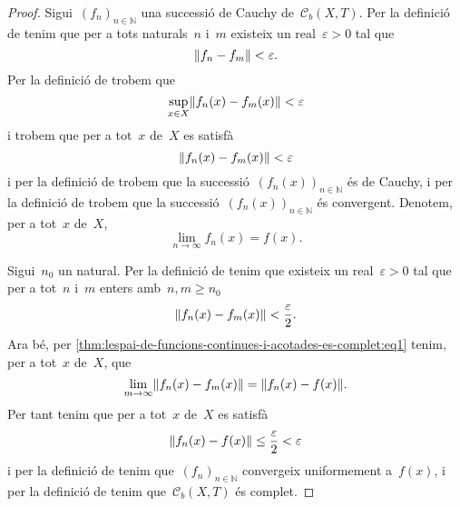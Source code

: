 \documentclass[../../main.tex]{subfiles}
\begin{document}
    \begin{proof}
        Sigui~\((f_{n})_{n\in\mathbb{N}}\) una successió de Cauchy de~\(\mathcal{C}_{b}(X,T)\).
        Per la definició de  tenim que per a tots naturals~\(n\) i~\(m\) existeix un real~\(\varepsilon>0\) tal que
        \[
            \norm{f_{n}-f_{m}}<\varepsilon.
        \]
        Per la definició de  trobem que
        \[
            \sup_{x\in X}\norm{f_{n}(x)-f_{m}(x)}<\varepsilon
        \]
        i trobem que per a tot~\(x\) de~\(X\) es satisfà
        \[
            \norm{f_{n}(x)-f_{m}(x)}<\varepsilon
        \]
        i per la definició de  trobem que la successió~\((f_{n}(x))_{n\in\mathbb{N}}\) és de Cauchy, i per la definició de  trobem que la successió~\((f_{n}(x))_{n\in\mathbb{N}}\) és convergent.
        Denotem, per a tot~\(x\) de~\(X\),
        \begin{equation}
            \label{thm:lespai-de-funcions-continues-i-acotades-es-complet:eq1}
            \lim_{n\to\infty}f_{n}(x)=f(x).
        \end{equation}

        Sigui~\(n_{0}\) un natural.
        Per la definició de  tenim que existeix un real~\(\varepsilon>0\) tal que per a tot~\(n\) i~\(m\) enters amb~\(n,m\geq n_{0}\)
        \[
            \norm{f_{n}(x)-f_{m}(x)}<\frac{\varepsilon}{2}.
        \]
        Ara bé, per \eqref{thm:lespai-de-funcions-continues-i-acotades-es-complet:eq1} tenim, per a tot~\(x\) de~\(X\), que
        \[
            \lim_{m\to\infty}\norm{f_{n}(x)-f_{m}(x)}=\norm{f_{n}(x)-f(x)}.
        \]
        Per tant tenim que per a tot~\(x\) de~\(X\) es satisfà
        \[
            \norm{f_{n}(x)-f(x)}\leq\frac{\varepsilon}{2}<\varepsilon
        \]
        i per la definició de  tenim que~\((f_{n})_{n\in\mathbb{N}}\) convergeix uniformement a~\(f(x)\), i per la definició de  tenim que~\(\mathcal{C}_{b}(X,T)\) és complet.
    \end{proof}
\end{document}
